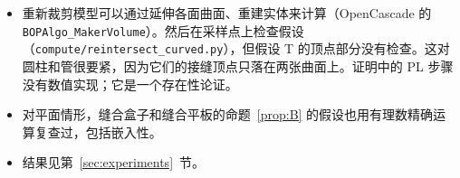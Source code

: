 \begin{remark}[假设的检查]
\begin{itemize}
\item 重新裁剪模型可以通过延伸各面曲面、重建实体来计算（OpenCascade 的 \texttt{BOPAlgo\_MakerVolume}）。然后在采样点上检查假设（\texttt{compute/reintersect\_curved.py}），但假设 T 的顶点部分没有检查。这对圆柱和管很要紧，因为它们的接缝顶点只落在两张曲面上。证明中的 PL 步骤没有数值实现；它是一个存在性论证。
\item 对平面情形，缝合盒子和缝合平板的命题~\ref{prop:B} 的假设也用有理数精确运算复查过，包括嵌入性。
\item 结果见第~\ref{sec:experiments}~节。
\end{itemize}
\end{remark}
